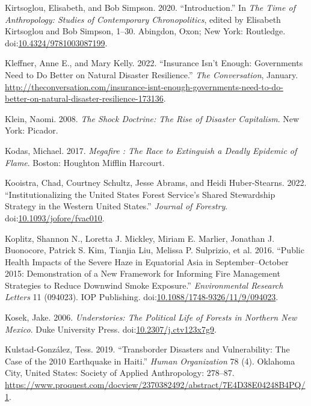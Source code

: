 \documentclass[
]{article}
\newlength{\cslhangindent}
\newenvironment{CSLReferences}[2] %
 {\begin{list}{}{%
  \setlength{\itemindent}{0pt}
  \setlength{\leftmargin}{0pt}
  \setlength{\parsep}{0pt}
  \ifodd #1
   \setlength{\leftmargin}{\cslhangindent}
   \setlength{\itemindent}{-1\cslhangindent}
  \fi
  \setlength{\itemsep}{#2\baselineskip}}}
 {\end{list}}
\begin{document}
\begin{CSLReferences}{1}{0}
Kirtsoglou, Elisabeth, and Bob Simpson. 2020. {``Introduction.''} In \emph{The {Time} of {Anthropology}: {Studies} of {Contemporary Chronopolitics}}, edited by Elisabeth Kirtsoglou and Bob Simpson, 1--30. Abingdon, Oxon; New York: Routledge. doi:\href{https://doi.org/10.4324/9781003087199}{10.4324/9781003087199}.

Kleffner, Anne E., and Mary Kelly. 2022. {``Insurance Isn't Enough: {Governments} Need to Do Better on Natural Disaster Resilience.''} \emph{The Conversation}, January. \url{http://theconversation.com/insurance-isnt-enough-governments-need-to-do-better-on-natural-disaster-resilience-173136}.

Klein, Naomi. 2008. \emph{The Shock Doctrine: The Rise of Disaster Capitalism}. New York: Picador.

Kodas, Michael. 2017. \emph{Megafire : The Race to Extinguish a Deadly Epidemic of Flame}. Boston: Houghton Mifflin Harcourt.

Kooistra, Chad, Courtney Schultz, Jesse Abrams, and Heidi Huber-Stearns. 2022. {``Institutionalizing the {United States Forest Service}'s {Shared Stewardship Strategy} in the {Western United States}.''} \emph{Journal of Forestry}. doi:\href{https://doi.org/10.1093/jofore/fvac010}{10.1093/jofore/fvac010}.

Koplitz, Shannon N., Loretta J. Mickley, Miriam E. Marlier, Jonathan J. Buonocore, Patrick S. Kim, Tianjia Liu, Melissa P. Sulprizio, et al. 2016. {``Public Health Impacts of the Severe Haze in {Equatorial Asia} in {September}--{October} 2015: Demonstration of a New Framework for Informing Fire Management Strategies to Reduce Downwind Smoke Exposure.''} \emph{Environmental Research Letters} 11 (094023). IOP Publishing. doi:\href{https://doi.org/10.1088/1748-9326/11/9/094023}{10.1088/1748-9326/11/9/094023}.

Kosek, Jake. 2006. \emph{Understories: {The Political Life} of {Forests} in {Northern New Mexico}}. Duke University Press. doi:\href{https://doi.org/10.2307/j.ctv123x7g9}{10.2307/j.ctv123x7g9}.

Kulstad-González, Tess. 2019. {``Transborder {Disasters} and {Vulnerability}: {The Case} of the 2010 {Earthquake} in {Haiti}.''} \emph{Human Organization} 78 (4). Oklahoma City, United States: Society of Applied Anthropology: 278--87. \url{https://www.proquest.com/docview/2370382492/abstract/7E4D38E04248B4PQ/1}.


\end{CSLReferences}
\end{document}
